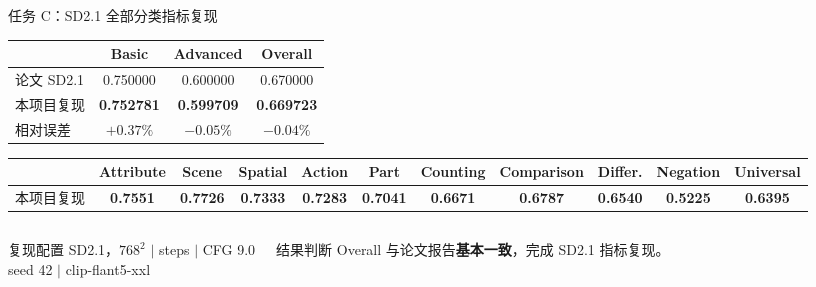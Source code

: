 \documentclass[aspectratio=169,10pt]{beamer}
\newcommand{\result}[1]{\textcolor{T2IBlue}{\bfseries #1}}
\newcommand{\diff}[1]{\textcolor{T2IRed}{\bfseries #1}}
\begin{document}
\begin{frame}{任务 C：SD2.1 全部分类指标复现}
  \begin{table}
    \centering\scriptsize
    \setlength{\tabcolsep}{8pt}
    \renewcommand{\arraystretch}{1.25}
    \begin{tabular}{lccc}
      \toprule
      & Basic & Advanced & Overall \\
      \midrule
      论文 SD2.1 & 0.750000 & 0.600000 & 0.670000 \\
      本项目复现 & \result{0.752781} & \result{0.599709} & \result{0.669723} \\
      相对误差 & \diff{$+0.37\%$} & \diff{$-0.05\%$} & \diff{$-0.04\%$} \\
      \bottomrule
    \end{tabular}
  \end{table}

  \vspace{0.45em}
  \begin{table}
    \centering\tiny
    \setlength{\tabcolsep}{3.2pt}
    \renewcommand{\arraystretch}{1.25}
    \begin{tabular}{lcccccccccc}
      \toprule
      & Attribute & Scene & Spatial & Action & Part & Counting & Comparison & Differ. & Negation & Universal \\
      \midrule
      本项目复现 & \result{0.7551} & \result{0.7726} & \result{0.7333} & \result{0.7283} & \result{0.7041} & \result{0.6671} & \result{0.6787} & \result{0.6540} & \result{0.5225} & \result{0.6395} \\
      \bottomrule
    \end{tabular}
  \end{table}

  \vspace{0.55em}
  \begin{columns}[T,onlytextwidth]
      \begin{block}{复现配置}
        \centering\small
        SD2.1，$768^2$ \quad $|$  steps \quad $|$ \quad CFG 9.0\\[0.35em]
        seed 42 \quad $|$ \quad clip-flant5-xxl
      \end{block}
      \begin{block}{结果判断}
        \centering\small
        Overall 与论文报告\textbf{基本一致}，完成 SD2.1 指标复现。
      \end{block}
  \end{columns}
\end{frame}
\end{document}
